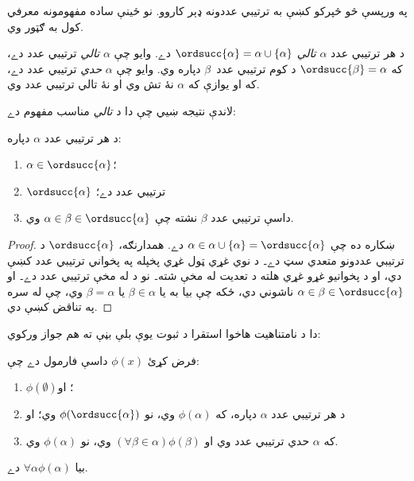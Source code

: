 \documentclass[../../../include/open-logic-section]{subfiles}
\begin{document}

په ورپسې څو څپرکو کښې به ترتيبي عددونه ډېر کاروو. نو ځينې ساده
مفهومونه معرفي کول به ګټور وي.

\begin{defn}
د هر ترتيبي عدد $\alpha$ \emph{تالي} $\ordsucc{\alpha}
=\alpha \cup \{\alpha\}$ دے. وايو چې $\alpha$ \emph{تالي} ترتيبي عدد دے،
که $\ordsucc{\beta} = \alpha$ د کوم ترتيبي عدد~$\beta$ دپاره وي.
وايو چې $\alpha$ \emph{حدي} ترتيبي عدد دے، که او يوازې که $\alpha$
نۀ تش وي او نۀ تالي ترتيبي عدد وي.
\end{defn}
\noindent
لاندې نتيجه ښيي چې دا د \emph{تالي} مناسب مفهوم دے:

\begin{prop}
د هر ترتيبي عدد $\alpha$ دپاره:
\begin{enumerate}
	\item $\alpha \in \ordsucc{\alpha}$؛
	\item $\ordsucc{\alpha}$ ترتيبي عدد دے؛
	\item داسې ترتيبي عدد $\beta$ نشته چې $\alpha \in \beta \in
	\ordsucc{\alpha}$ وي.
	\end{enumerate}
\end{prop}

\begin{proof}
ښکاره ده چې $\alpha \in \alpha \cup \{\alpha\} = \ordsucc{\alpha}$ دے.
همدارنګه، $\ordsucc{\alpha}$ د ترتيبي عددونو متعدي سټ دے۔
د نوي غړي ټول غړي پخپله په پخواني ترتيبي عدد کښې دي، او د
پخوانيو غړو غړي هلته د تعديت له مخې شته۔ نو د
 له مخې ترتيبي عدد دے۔
او $\alpha \in \beta \in \ordsucc{\alpha}$ ناشوني دي، ځکه چې بيا به يا
$\beta \in \alpha$ يا $\beta = \alpha$ وي، چې له
 سره په تناقض کښې دي.
\end{proof}
\noindent
دا د نامتناهيت هاخوا استقرا د ثبوت يوې بلې بڼې ته هم جواز ورکوي:

\begin{thm}
فرض کړئ $\phi(x)$ داسې فارمول دے چې:
\begin{enumerate}
	\item $\phi(\emptyset)$؛ او
	\item د هر ترتيبي عدد $\alpha$ دپاره، که $\phi(\alpha)$ وي، نو
	$\phi(\ordsucc{\alpha})$ وي؛ او
	\item که $\alpha$ حدي ترتيبي عدد وي او $(\forall \beta \in
	\alpha)\phi(\beta)$ وي، نو $\phi(\alpha)$ وي.
\end{enumerate}
بيا $\forall \alpha \phi(\alpha)$ دے.
\end{thm}
\end{document}
